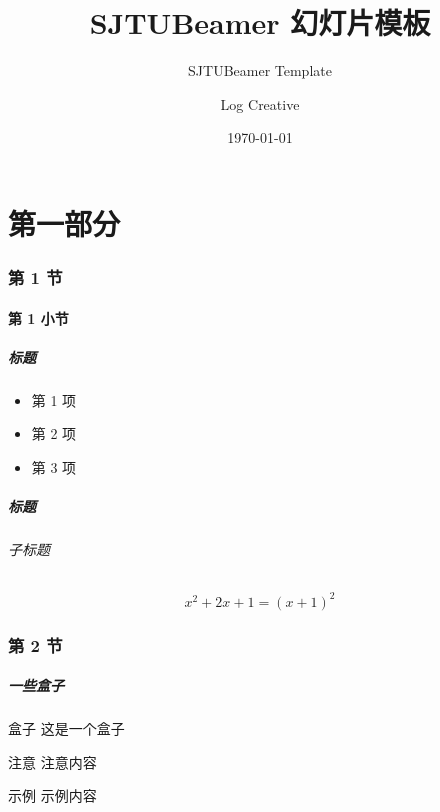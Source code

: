 \documentclass[
    aspectratio=169,                   %
]{beamer}
\institute[School of Mathematical Sciences]{数学科学学院}   %
\title{\textsf{SJTUBeamer} 幻灯片模板}  %
\subtitle{SJTUBeamer Template}         %
\author{Log Creative}                  %
\date{\today}                          %
\begin{document}
    \maketitle                         %

\part{第一部分}


\section{第 1 节}
\subsection{第 1 小节}
\frame{\subsectionpage}

    \begin{frame}
        \frametitle{标题}

        \begin{itemize}
            \item 第 1 项
            \item 第 2 项
            \item 第 3 项
        \end{itemize}

    \end{frame}

    \begin{frame}
        \frametitle{标题}
        \framesubtitle{子标题}

        \begin{equation}
            x^2+2x+1=(x+1)^2
        \end{equation}
        
    \end{frame}

\section{第 2 节}
    \begin{frame}
        \frametitle{一些盒子}
        
        \begin{block}{盒子}
            这是一个盒子\cite{beamerman}
        \end{block}

        \begin{alertblock}{注意}
            注意内容
        \end{alertblock}

        \begin{exampleblock}{示例}
            示例内容
        \end{exampleblock}
    \end{frame}
\end{document}
